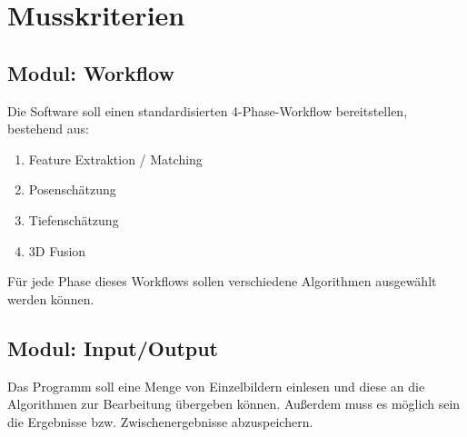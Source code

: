
\section{Musskriterien}
\subsection{Modul: Workflow}
Die Software soll einen standardisierten 4-Phase-Workflow bereitstellen, bestehend aus:

\begin{enumerate}
		\item Feature Extraktion / Matching
		\item Posenschätzung
		\item Tiefenschätzung
		\item 3D Fusion
\end{enumerate}
Für jede Phase dieses Workflows sollen verschiedene Algorithmen ausgewählt werden können.
\subsection{Modul: Input/Output}
Das Programm soll eine Menge von Einzelbildern einlesen und diese an die Algorithmen zur Bearbeitung übergeben können. Außerdem muss es möglich sein die Ergebnisse bzw. Zwischenergebnisse abzuspeichern.
